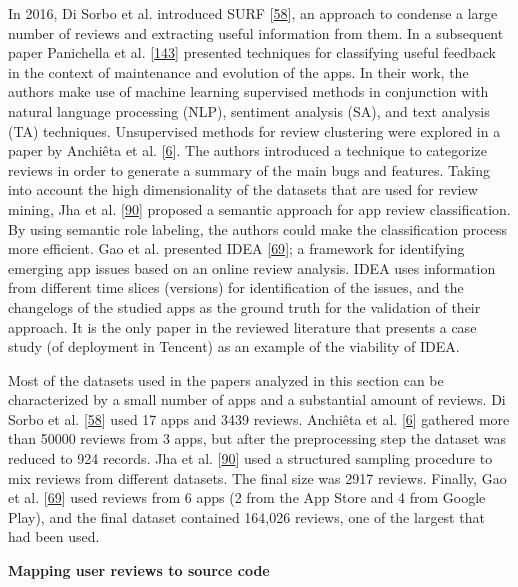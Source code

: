 \documentclass[]{book}
\begin{document}
In 2016, Di Sorbo et al. introduced SURF
{[}\protect\hyperlink{ref-di2016would}{58}{]}, an approach to condense a
large number of reviews and extracting useful information from them. In
a subsequent paper Panichella et al.
{[}\protect\hyperlink{ref-panichella2016ardoc}{143}{]} presented
techniques for classifying useful feedback in the context of maintenance
and evolution of the apps. In their work, the authors make use of
machine learning supervised methods in conjunction with natural language
processing (NLP), sentiment analysis (SA), and text analysis (TA)
techniques. Unsupervised methods for review clustering were explored in
a paper by Anchiêta et al.
{[}\protect\hyperlink{ref-anchieta2017}{6}{]}. The authors introduced a
technique to categorize reviews in order to generate a summary of the
main bugs and features. Taking into account the high dimensionality of
the datasets that are used for review mining, Jha et al.
{[}\protect\hyperlink{ref-jha2017mining}{90}{]} proposed a semantic
approach for app review classification. By using semantic role labeling,
the authors could make the classification process more efficient. Gao et
al. presented IDEA {[}\protect\hyperlink{ref-gao2018online}{69}{]}; a
framework for identifying emerging app issues based on an online review
analysis. IDEA uses information from different time slices (versions)
for identification of the issues, and the changelogs of the studied apps
as the ground truth for the validation of their approach. It is the only
paper in the reviewed literature that presents a case study (of
deployment in Tencent) as an example of the viability of IDEA.

Most of the datasets used in the papers analyzed in this section can be
characterized by a small number of apps and a substantial amount of
reviews. Di Sorbo et al. {[}\protect\hyperlink{ref-di2016would}{58}{]}
used 17 apps and 3439 reviews. Anchiêta et al.
{[}\protect\hyperlink{ref-anchieta2017}{6}{]} gathered more than 50000
reviews from 3 apps, but after the preprocessing step the dataset was
reduced to 924 records. Jha et al.
{[}\protect\hyperlink{ref-jha2017mining}{90}{]} used a structured
sampling procedure to mix reviews from different datasets. The final
size was 2917 reviews. Finally, Gao et al.
{[}\protect\hyperlink{ref-gao2018online}{69}{]} used reviews from 6 apps
(2 from the App Store and 4 from Google Play), and the final dataset
contained 164,026 reviews, one of the largest that had been used.

\textbf{Mapping user reviews to source code}
\end{document}

